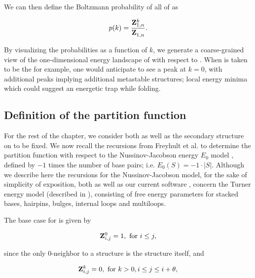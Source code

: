 We can then define the Boltzmann probability of all \kNbrs of \strSt as

\begin{align}
\label{eq:fftbor:probK}
p(k) =\frac{\bfZ{k}{1,n}}{\bfZ{}{1,n}}.
\end{align}

By visualizing the probabilities \pk as a function of $k$, we generate a
coarse-grained view of the one-dimensional energy landscape of \seq with
respect to \strSt. When \strSt is taken to be the \mfes for example, one would
anticipate to see a peak at $k=0$, with additional peaks implying additional
metastable structures; local energy minima which could suggest an energetic
trap while folding.

\subsection{Definition of the partition function
\texorpdfstring{}{}}
\label{subsec:fftbor:recursions}

For the rest of the chapter, we consider both \seq as well as the
secondary structure \strSt on \seq to be fixed. We now recall the
recursions from Freyhult et al. \citep{Freyhult.ab05} to determine
the partition function  with
respect to the Nussinov-Jacobson
energy $E_0$ model \citep{nussinovjacobson}, defined by
$-1$ times the number of base pairs; i.e. $E_0(S) = -1 \cdot |S|$.
Although we describe here the recursions for the Nussinov-Jacobson
model, for the sake of
simplicity of exposition, both \rnabor
\citep{Freyhult.ab05} as well as our current software \fftbor,
concern the Turner energy model (described in ), consisting of free energy parameters for
stacked bases, hairpins, bulges, internal loops and multiloops.


The base case for  is given by

\begin{align}
\label{eq:fftbor:initZpart1}
\bfZ{0}{i,j} = 1, \text{ for } i \le j,
\end{align}

since the only $0$-neighbor to a structure \strSt
is the structure \strSt itself, and

\begin{align}
\label{eq:fftbor:initZpart2}
\bfZ{k}{i,j} = 0, \text{ for } k > 0, i \le j \leq i + \theta,
\end{align}

